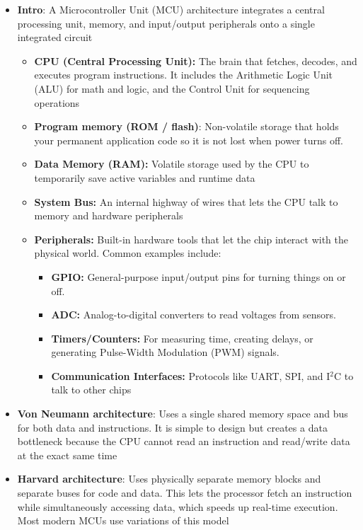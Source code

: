 \documentclass{report}
\begin{document}
    \begin{itemize}
        \item \textbf{Intro}: A Microcontroller Unit (MCU) architecture integrates a central processing unit, memory, and input/output peripherals onto a single integrated circuit
            \begin{itemize}
                \item \textbf{CPU (Central Processing Unit):} The brain that fetches, decodes, and executes program instructions. It includes the Arithmetic Logic Unit (ALU) for math and logic, and the Control Unit for sequencing operations
                \item \textbf{Program memory (ROM / flash)}: Non-volatile storage that holds your permanent application code so it is not lost when power turns off. 
                \item \textbf{Data Memory (RAM):} Volatile storage used by the CPU to temporarily save active variables and runtime data
                \item \textbf{System Bus:} An internal highway of wires that lets the CPU talk to memory and hardware peripherals
                \item \textbf{Peripherals:} Built-in hardware tools that let the chip interact with the physical world. Common examples include:
                    \begin{itemize}
                        \item \textbf{GPIO:} General-purpose input/output pins for turning things on or off.
                        \item \textbf{ADC:} Analog-to-digital converters to read voltages from sensors.
                        \item \textbf{Timers/Counters:} For measuring time, creating delays, or generating Pulse-Width Modulation (PWM) signals.
                        \item \textbf{Communication Interfaces:} Protocols like UART, SPI, and I$^2$C to talk to other chips
                    \end{itemize}
            \end{itemize}
        \item \textbf{Von Neumann architecture}: Uses a single shared memory space and bus for both data and instructions. It is simple to design but creates a data bottleneck because the CPU cannot read an instruction and read/write data at the exact same time
        \item \textbf{Harvard architecture}: Uses physically separate memory blocks and separate buses for code and data. This lets the processor fetch an instruction while simultaneously accessing data, which speeds up real-time execution. Most modern MCUs use variations of this model

\end{itemize}
\end{document}
